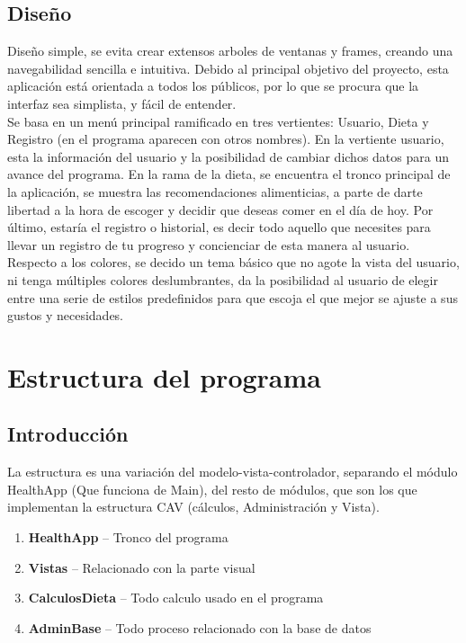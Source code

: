 \subsection{Diseño}
Diseño simple, se evita crear extensos arboles de ventanas y frames, creando una navegabilidad sencilla e intuitiva. Debido al principal objetivo del proyecto,  esta aplicación está orientada a todos los públicos, por lo que se procura que la interfaz sea simplista, y fácil de entender.\\

Se basa en un menú principal ramificado en tres vertientes: Usuario, Dieta y Registro (en el programa aparecen con otros nombres). En la vertiente usuario, esta la información del usuario y la posibilidad de cambiar dichos datos para un avance del programa. En la rama de la dieta, se encuentra el tronco principal de la aplicación, se muestra las recomendaciones alimenticias, a parte de darte libertad a la hora de escoger y decidir que deseas comer en el día de hoy. Por último, estaría el registro o historial, es decir todo aquello que necesites para llevar un registro de tu progreso y concienciar de esta manera al usuario.\\

Respecto a los colores, se decido un tema básico que no agote la vista del usuario, ni tenga múltiples colores deslumbrantes, da la posibilidad al usuario de elegir entre una serie de estilos predefinidos para que escoja el que mejor se ajuste a sus gustos y necesidades.\\
\section{Estructura del programa}
\subsection{Introducción}

La estructura es una variación del modelo-vista-controlador, separando el módulo HealthApp (Que funciona de Main), del resto de módulos, que son los que implementan la estructura CAV (cálculos, Administración y Vista).
\begin{enumerate}
\item	\textbf{HealthApp} – Tronco del programa
\item	\textbf{Vistas} – Relacionado con la parte visual
\item	\textbf{CalculosDieta} – Todo calculo usado en el programa
\item	\textbf{AdminBase} – Todo proceso relacionado con la base de datos

\end{enumerate}

